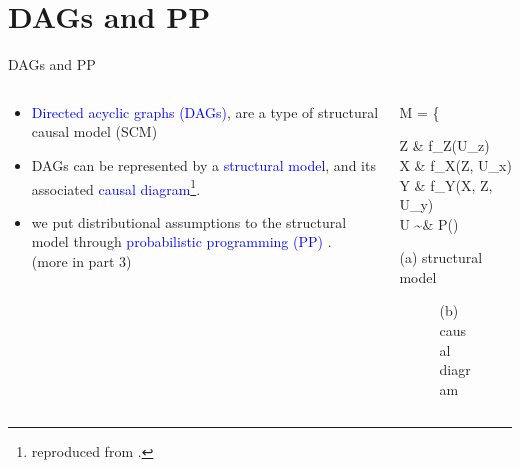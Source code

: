 \section{DAGs and PP}
%
%
\begin{frame}[t, negative]
	\subsectionpage
\end{frame}
%
%
\begin{frame}
	{DAGs and PP}
	\begin{columns}
		\begin{column}{0.5\textwidth}
			\begin{itemize}
				\item \textcolor{blue}{Directed acyclic graphs (DAGs)}, are a type of structural causal model (SCM) \cite{Pearl_2009, Cinelli_et_al_2021}
				\item DAGs can be represented by a \textcolor{blue}{structural model}, and its associated \textcolor{blue}{causal diagram}\footnote{reproduced from \citet{Cinelli_et_al_2021}.}.
				\item we put distributional assumptions to the structural model through \textcolor{blue}{probabilistic programming (PP)} \cite{Jaynes_2003}. \\
				{\small \alert{(more in part 3)} }
			\end{itemize}
		\end{column}
		\begin{column}{0.5\textwidth}  
			\begin{equ}
				M = \left\{ \begin{aligned} 
					Z \leftarrow & \; f_{Z}(U_{z}) \\
					X \leftarrow & \; f_{X}(Z, U_{x}) \\
					Y \leftarrow & \; f_{Y}(X, Z, U_{y}) \\
					U \sim & \; P()
				\end{aligned} \right
				\caption*{(a) structural model}
			\end{equ}
			\begin{figure}
				\caption*{(b) causal diagram }
			\end{figure}
		\end{column}
	\end{columns}
\end{frame}
